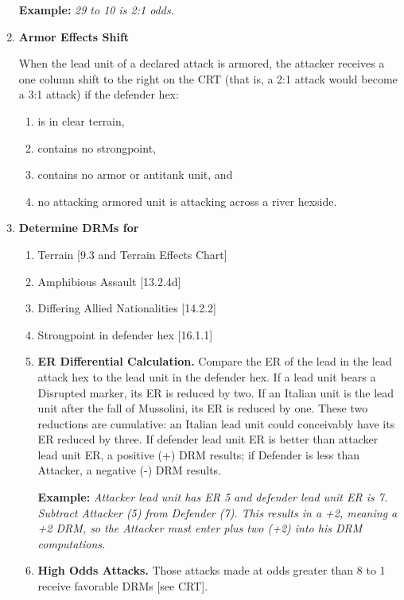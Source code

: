 \begin{enumerate}[label=\textbf{\Roman*.}]
    \textbf{Example:} \textit{29 to 10 is 2:1 odds.}
    \item \textbf{Armor Effects Shift}
    \par
    When the lead unit of a declared attack is armored, the attacker receives a one column shift to the right on the CRT (that is, a 2:1 attack would become a 3:1 attack) if the defender hex:
    \begin{enumerate}[label=\alph*.]
        \item is in clear terrain,
        \item contains no strongpoint,
        \item contains no armor or antitank unit, and
        \item no attacking armored unit is attacking across a river hexside.
    \end{enumerate}
    
    \item \textbf{Determine DRMs for}
    
    \begin{enumerate}[label=\alph*.]
        \item Terrain [9.3 and Terrain Effects Chart]
        \item Amphibious Assault [13.2.4d]
        \item Differing Allied Nationalities [14.2.2]
        \item Strongpoint in defender hex [16.1.1]
        \item \textbf{ER Differential Calculation.} Compare the ER of the lead in the lead attack hex to the lead unit in the defender hex. If a lead unit bears a Disrupted marker, its ER is reduced by two. If an Italian unit is the lead unit after the fall of Mussolini, its ER is reduced by one. These two reductions are cumulative: an Italian lead unit could conceivably have its ER reduced by three. If defender lead unit ER is better than attacker lead unit ER, a positive (+) DRM results; if Defender is less than Attacker, a negative (-) DRM results.
        
        \textbf{Example:} \textit{Attacker lead unit has ER 5 and defender lead unit ER is 7. Subtract Attacker (5) from Defender (7). This results in a +2, meaning a +2 DRM, so the Attacker must enter plus two (+2) into his DRM computations.}
        
        \item \textbf{High Odds Attacks.} Those attacks made at odds greater than 8 to 1 receive favorable DRMs [see CRT].
    \end{enumerate}
    

\end{enumerate}
